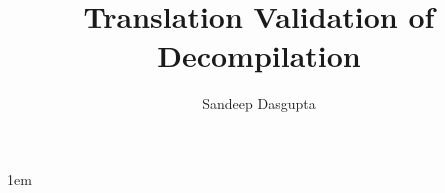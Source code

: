 \documentclass[tocnosub,noragright,centerchapter,fullpagesingle,12pt]{uiuc_csthesis18}
\title{Translation Validation of Decompilation}
\author{Sandeep Dasgupta}
\begin{document}
%

%
\maketitle

\parindent 1em%

\frontmatter

%
\begin{abstract}

\end{abstract}


%

%
%

%
\tableofcontents

\mainmatter

%










%
%

\backmatter

%


%



\end{document}
